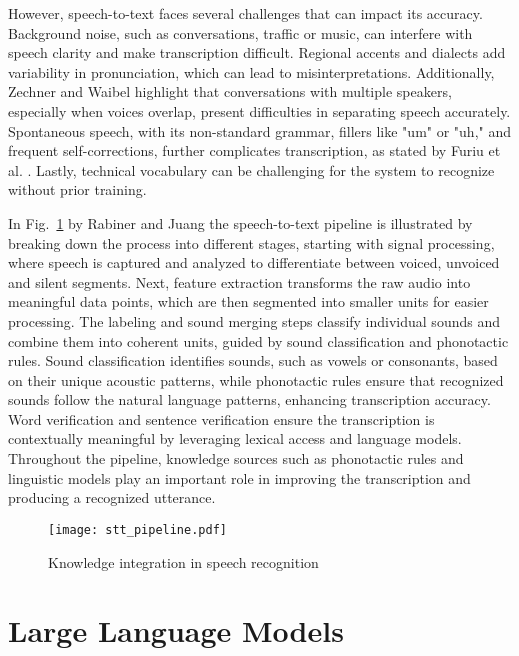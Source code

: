 However, speech-to-text faces several challenges that can impact its accuracy. Background noise, such as conversations, traffic or music, can interfere with speech clarity and make transcription difficult. Regional accents and dialects add variability in pronunciation, which can lead to misinterpretations. Additionally, Zechner and Waibel \cite{zechner20000spontaeousspeech} highlight that conversations with multiple speakers, especially when voices overlap, present difficulties in separating speech accurately. Spontaneous speech, with its non-standard grammar, fillers like "um" or "uh," and frequent self-corrections, further complicates transcription, as stated by Furiu et al. \cite{furiu2004spontaneousspeech}. Lastly, technical vocabulary can be challenging for the system to recognize without prior training.

In Fig.~\ref{fig:stt_pipeline} by Rabiner and Juang \cite{rabiner1993speechrecognition}  the speech-to-text pipeline is illustrated by breaking down the process into different stages, starting with signal processing, where speech is captured and analyzed to differentiate between voiced, unvoiced and silent segments. Next, feature extraction transforms the raw audio into meaningful data points, which are then segmented into smaller units for easier processing. The labeling and sound merging steps classify individual sounds and combine them into coherent units, guided by sound classification and phonotactic rules. Sound classification identifies sounds, such as vowels or consonants, based on their unique acoustic patterns, while phonotactic rules ensure that recognized sounds follow the natural language patterns, enhancing transcription accuracy.  Word verification and sentence verification ensure the transcription is contextually meaningful by leveraging lexical access and language models. Throughout the pipeline, knowledge sources such as phonotactic rules and linguistic models play an important role in improving the transcription and producing a recognized utterance.

\begin{figure}[htbp]
    \centering
    \texttt{[image: stt\_pipeline.pdf]}
    \caption{Knowledge integration in speech recognition \cite{rabiner1993speechrecognition}}
    \label{fig:stt_pipeline}
\end{figure}

\section{Large Language Models}


